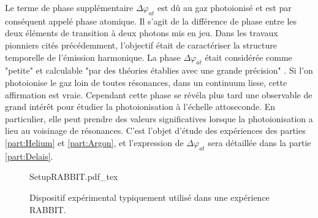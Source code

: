 Le terme de phase supplémentaire $\Delta \varphi_{at}$ est dû au gaz photoionisé et est par conséquent appelé phase atomique. Il s'agit de la différence de phase entre les deux éléments de transition à deux photons mis en jeu. Dans les travaux pionniers cités précédemment, l'objectif était de caractériser la structure temporelle de l'émission harmonique. La phase $\Delta \varphi_{at}$ était considérée comme "petite" et calculable "par des théories établies avec une grande précision" . Si l'on photoionise le gaz loin de toutes résonances, dans un continuum lisse, cette affirmation est vraie. Cependant cette phase se révéla plus tard une observable de grand intérêt pour étudier la photoionisation à l'échelle attoseconde. En particulier, elle peut prendre des valeurs significatives lorsque la photoionisation a lieu au voisinage de résonances. C'est l'objet d'étude des expériences des parties \ref{part:Helium} et \ref{part:Argon}, et l'expression de $\Delta \varphi_{at}$ sera détaillée dans la partie \ref{part:Delais}.

\begin{figure}[ht]
\centering
\def\svgwidth{\columnwidth}
{SetupRABBIT.pdf_tex}
\caption{Dispositif expérimental typiquement utilisé dans une expérience RABBIT.}
\label{fig:SetupRabbit}
\end{figure}

